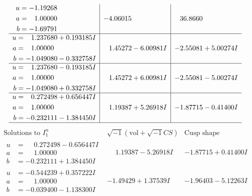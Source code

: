 \documentclass[1p]{elsarticle_modified}
\theoremstyle{definition}
\newcommand{\I}{\sqrt{-1}}
\begin{document}
$$\begin{array}{c|c|c}
\begin{aligned}
u &= -1.19268\phantom{ +0.000000I} \\
a &= \phantom{-}1.00000\phantom{ +0.000000I} \\
b &= -1.69791\phantom{ +0.000000I}\end{aligned}
 & -4.06015\phantom{ +0.000000I} & \phantom{-}36.8660\phantom{ +0.000000I} \\ \hline\begin{aligned}
u &= \phantom{-}1.237680 + 0.193185 I \\
a &= \phantom{-}1.00000\phantom{ +0.000000I} \\
b &= -1.049080 - 0.332758 I\end{aligned}
 & \phantom{-}1.45272 - 6.00981 I & -2.55081 + 5.00274 I \\ \hline\begin{aligned}
u &= \phantom{-}1.237680 - 0.193185 I \\
a &= \phantom{-}1.00000\phantom{ +0.000000I} \\
b &= -1.049080 + 0.332758 I\end{aligned}
 & \phantom{-}1.45272 + 6.00981 I & -2.55081 - 5.00274 I \\ \hline\begin{aligned}
u &= \phantom{-}0.272498 + 0.656447 I \\
a &= \phantom{-}1.00000\phantom{ +0.000000I} \\
b &= -0.232111 - 1.384450 I\end{aligned}
 & \phantom{-}1.19387 + 5.26918 I & -1.87715 - 0.41400 I\\
 \hline 
 \end{array}$$\newpage$$\begin{array}{c|c|c}  
\text{Solutions to }I^u_{1}& \I (\text{vol} + \sqrt{-1}CS) & \text{Cusp shape}\\
 \hline 
\begin{aligned}
u &= \phantom{-}0.272498 - 0.656447 I \\
a &= \phantom{-}1.00000\phantom{ +0.000000I} \\
b &= -0.232111 + 1.384450 I\end{aligned}
 & \phantom{-}1.19387 - 5.26918 I & -1.87715 + 0.41400 I \\ \hline\begin{aligned}
u &= -0.544239 + 0.357222 I \\
a &= \phantom{-}1.00000\phantom{ +0.000000I} \\
b &= -0.039400 - 1.138300 I\end{aligned}
 & -1.49429 + 1.37539 I & -1.96403 - 5.12263 I \\ \hline\begin{aligned}

\end{aligned}
\end{array}$$
\end{document}
